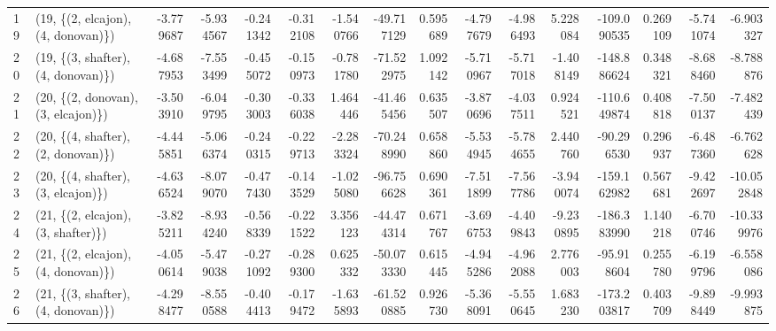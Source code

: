 \begin{tabular}{llrrrrrrrrrrrrrr}
19 &  (19, \{(2, elcajon), (4, donovan)\}) &  -3.779687 &  -5.934567 &  -0.241342 & -0.312108 &  -1.540766 &   -49.717129 &   0.595689 &  -4.797679 &  -4.986493 &   5.228084 & -109.090535 &  0.269109 &  -5.741074 &  -6.903327 \\
20 &  (19, \{(3, shafter), (4, donovan)\}) &  -4.687953 &  -7.553499 &  -0.455072 & -0.150973 &  -0.781780 &   -71.522975 &   1.092142 &  -5.710967 &  -5.717018 &  -1.408149 & -148.886624 &  0.348321 &  -8.688460 &  -8.788876 \\
21 &  (20, \{(2, donovan), (3, elcajon)\}) &  -3.503910 &  -6.049795 &  -0.303003 & -0.336038 &   1.464446 &   -41.465456 &   0.635507 &  -3.870696 &  -4.037511 &   0.924521 & -110.649874 &  0.408818 &  -7.500137 &  -7.482439 \\
22 &  (20, \{(4, shafter), (2, donovan)\}) &  -4.445851 &  -5.066374 &  -0.240315 & -0.229713 &  -2.283324 &   -70.248990 &   0.658860 &  -5.534945 &  -5.784655 &   2.440760 &  -90.296530 &  0.296937 &  -6.487360 &  -6.762628 \\
23 &  (20, \{(4, shafter), (3, elcajon)\}) &  -4.636524 &  -8.079070 &  -0.477430 & -0.143529 &  -1.025080 &   -96.756628 &   0.690361 &  -7.511899 &  -7.567786 &  -3.940074 & -159.162982 &  0.567681 &  -9.422697 & -10.052848 \\
24 &  (21, \{(2, elcajon), (3, shafter)\}) &  -3.825211 &  -8.934240 &  -0.568339 & -0.221522 &   3.356123 &   -44.474314 &   0.671767 &  -3.696753 &  -4.409843 &  -9.230895 & -186.383990 &  1.140218 &  -6.700746 & -10.339976 \\
25 &  (21, \{(2, elcajon), (4, donovan)\}) &  -4.050614 &  -5.479038 &  -0.271092 & -0.289300 &   0.625332 &   -50.073330 &   0.615445 &  -4.945286 &  -4.962088 &   2.776003 &  -95.918604 &  0.255780 &  -6.199796 &  -6.558086 \\
26 &  (21, \{(3, shafter), (4, donovan)\}) &  -4.298477 &  -8.550588 &  -0.404413 & -0.179472 &  -1.635893 &   -61.520885 &   0.926730 &  -5.368091 &  -5.550645 &   1.683230 & -173.203817 &  0.403709 &  -9.898449 &  -9.993875 \\
\bottomrule
\end{tabular}
